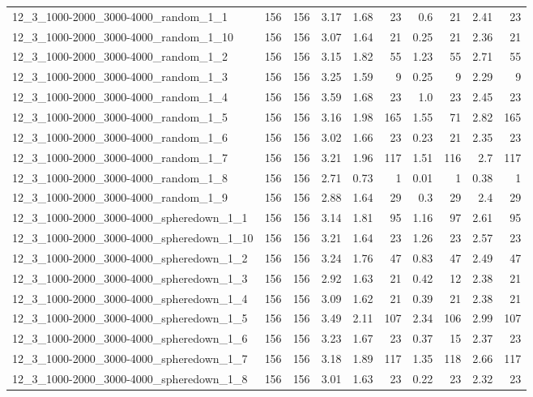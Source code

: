 \begin{center}
\begin{scriptsize}
\begin{longtable}{lrrrrrrrrr}
12\_3\_1000-2000\_3000-4000\_random\_1\_1 & 156 & 156 & 3.17 & 1.68 & 23 & 0.6 & 21 & 2.41 & 23\\
12\_3\_1000-2000\_3000-4000\_random\_1\_10 & 156 & 156 & 3.07 & 1.64 & 21 & 0.25 & 21 & 2.36 & 21\\
12\_3\_1000-2000\_3000-4000\_random\_1\_2 & 156 & 156 & 3.15 & 1.82 & 55 & 1.23 & 55 & 2.71 & 55\\
12\_3\_1000-2000\_3000-4000\_random\_1\_3 & 156 & 156 & 3.25 & 1.59 & 9 & 0.25 & 9 & 2.29 & 9\\
12\_3\_1000-2000\_3000-4000\_random\_1\_4 & 156 & 156 & 3.59 & 1.68 & 23 & 1.0 & 23 & 2.45 & 23\\
12\_3\_1000-2000\_3000-4000\_random\_1\_5 & 156 & 156 & 3.16 & 1.98 & 165 & 1.55 & 71 & 2.82 & 165\\
12\_3\_1000-2000\_3000-4000\_random\_1\_6 & 156 & 156 & 3.02 & 1.66 & 23 & 0.23 & 21 & 2.35 & 23\\
12\_3\_1000-2000\_3000-4000\_random\_1\_7 & 156 & 156 & 3.21 & 1.96 & 117 & 1.51 & 116 & 2.7 & 117\\
12\_3\_1000-2000\_3000-4000\_random\_1\_8 & 156 & 156 & 2.71 & 0.73 & 1 & 0.01 & 1 & 0.38 & 1\\
12\_3\_1000-2000\_3000-4000\_random\_1\_9 & 156 & 156 & 2.88 & 1.64 & 29 & 0.3 & 29 & 2.4 & 29\\
12\_3\_1000-2000\_3000-4000\_spheredown\_1\_1 & 156 & 156 & 3.14 & 1.81 & 95 & 1.16 & 97 & 2.61 & 95\\
12\_3\_1000-2000\_3000-4000\_spheredown\_1\_10 & 156 & 156 & 3.21 & 1.64 & 23 & 1.26 & 23 & 2.57 & 23\\
12\_3\_1000-2000\_3000-4000\_spheredown\_1\_2 & 156 & 156 & 3.24 & 1.76 & 47 & 0.83 & 47 & 2.49 & 47\\
12\_3\_1000-2000\_3000-4000\_spheredown\_1\_3 & 156 & 156 & 2.92 & 1.63 & 21 & 0.42 & 12 & 2.38 & 21\\
12\_3\_1000-2000\_3000-4000\_spheredown\_1\_4 & 156 & 156 & 3.09 & 1.62 & 21 & 0.39 & 21 & 2.38 & 21\\
12\_3\_1000-2000\_3000-4000\_spheredown\_1\_5 & 156 & 156 & 3.49 & 2.11 & 107 & 2.34 & 106 & 2.99 & 107\\
12\_3\_1000-2000\_3000-4000\_spheredown\_1\_6 & 156 & 156 & 3.23 & 1.67 & 23 & 0.37 & 15 & 2.37 & 23\\
12\_3\_1000-2000\_3000-4000\_spheredown\_1\_7 & 156 & 156 & 3.18 & 1.89 & 117 & 1.35 & 118 & 2.66 & 117\\
12\_3\_1000-2000\_3000-4000\_spheredown\_1\_8 & 156 & 156 & 3.01 & 1.63 & 23 & 0.22 & 23 & 2.32 & 23\\

\end{longtable}
\end{scriptsize}
\end{center}
